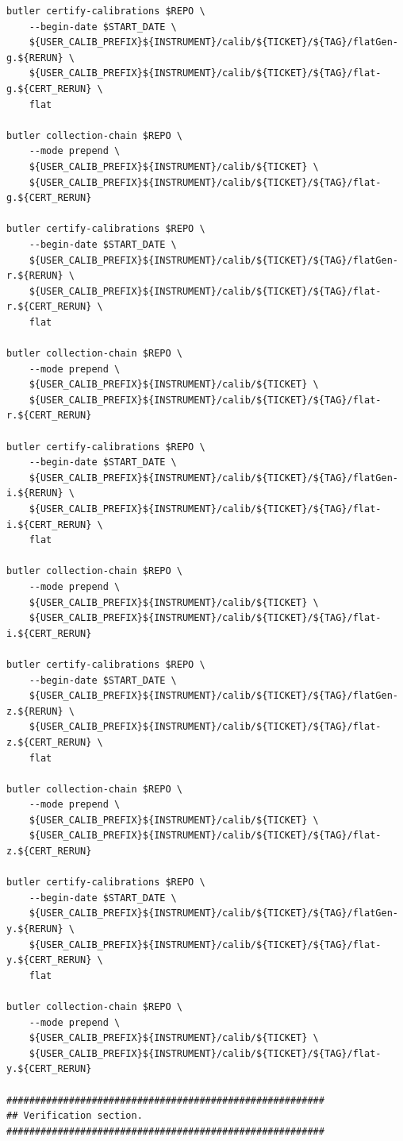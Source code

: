 \documentclass[DM,authoryear,toc]{lsstdoc}
\begin{document}
\begin{footnotesize}
\begin{verbatim}
butler certify-calibrations $REPO \
    --begin-date $START_DATE \
    ${USER_CALIB_PREFIX}${INSTRUMENT}/calib/${TICKET}/${TAG}/flatGen-g.${RERUN} \
    ${USER_CALIB_PREFIX}${INSTRUMENT}/calib/${TICKET}/${TAG}/flat-g.${CERT_RERUN} \
    flat

butler collection-chain $REPO \
    --mode prepend \
    ${USER_CALIB_PREFIX}${INSTRUMENT}/calib/${TICKET} \
    ${USER_CALIB_PREFIX}${INSTRUMENT}/calib/${TICKET}/${TAG}/flat-g.${CERT_RERUN}

butler certify-calibrations $REPO \
    --begin-date $START_DATE \
    ${USER_CALIB_PREFIX}${INSTRUMENT}/calib/${TICKET}/${TAG}/flatGen-r.${RERUN} \
    ${USER_CALIB_PREFIX}${INSTRUMENT}/calib/${TICKET}/${TAG}/flat-r.${CERT_RERUN} \
    flat

butler collection-chain $REPO \
    --mode prepend \
    ${USER_CALIB_PREFIX}${INSTRUMENT}/calib/${TICKET} \
    ${USER_CALIB_PREFIX}${INSTRUMENT}/calib/${TICKET}/${TAG}/flat-r.${CERT_RERUN}

butler certify-calibrations $REPO \
    --begin-date $START_DATE \
    ${USER_CALIB_PREFIX}${INSTRUMENT}/calib/${TICKET}/${TAG}/flatGen-i.${RERUN} \
    ${USER_CALIB_PREFIX}${INSTRUMENT}/calib/${TICKET}/${TAG}/flat-i.${CERT_RERUN} \
    flat

butler collection-chain $REPO \
    --mode prepend \
    ${USER_CALIB_PREFIX}${INSTRUMENT}/calib/${TICKET} \
    ${USER_CALIB_PREFIX}${INSTRUMENT}/calib/${TICKET}/${TAG}/flat-i.${CERT_RERUN}

butler certify-calibrations $REPO \
    --begin-date $START_DATE \
    ${USER_CALIB_PREFIX}${INSTRUMENT}/calib/${TICKET}/${TAG}/flatGen-z.${RERUN} \
    ${USER_CALIB_PREFIX}${INSTRUMENT}/calib/${TICKET}/${TAG}/flat-z.${CERT_RERUN} \
    flat

butler collection-chain $REPO \
    --mode prepend \
    ${USER_CALIB_PREFIX}${INSTRUMENT}/calib/${TICKET} \
    ${USER_CALIB_PREFIX}${INSTRUMENT}/calib/${TICKET}/${TAG}/flat-z.${CERT_RERUN}

butler certify-calibrations $REPO \
    --begin-date $START_DATE \
    ${USER_CALIB_PREFIX}${INSTRUMENT}/calib/${TICKET}/${TAG}/flatGen-y.${RERUN} \
    ${USER_CALIB_PREFIX}${INSTRUMENT}/calib/${TICKET}/${TAG}/flat-y.${CERT_RERUN} \
    flat

butler collection-chain $REPO \
    --mode prepend \
    ${USER_CALIB_PREFIX}${INSTRUMENT}/calib/${TICKET} \
    ${USER_CALIB_PREFIX}${INSTRUMENT}/calib/${TICKET}/${TAG}/flat-y.${CERT_RERUN}

########################################################
## Verification section.
########################################################


\end{verbatim}
\end{footnotesize}
\end{document}
